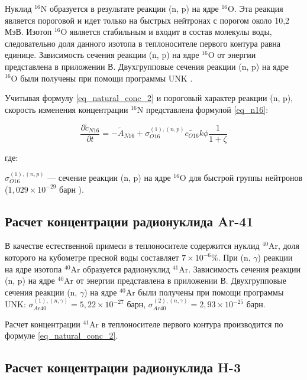 Нуклид $^{16}\text{N}$ образуется в результате реакции (n, p) на ядре $^{16}\text{O}$. Эта реакция является 
пороговой и идет только на быстрых нейтронах с порогом около 10,2 МэВ. Изотоп $^{16}\text{O}$ является стабильным и 
входит в состав молекулы воды, следовательно доля данного изотопа в теплоносителе первого контура равна единице. 
Зависимость сечения реакции (n, p) на ядре $^{16}\text{O}$ от энергии представлена в приложении В. Двухгрупповые 
сечения реакции (n, p) на ядре $^{16}\text{O}$ были получены при помощи программы UNK \cite{unk}.

Учитывая формулу \ref{eq_natural_conc_2} и пороговый характер реакции (n, p), скорость изменения концентрации 
$^{16}\text{N}$ представлена формулой \ref{eq_n16}:

\begin{equation}
    \label{eq_n16}
    \frac{\partial \widetilde{c}_{N16}}{\partial t} = -\widetilde{A}_{N16} + \sigma_{O16}^{(1), (n, p)} \widetilde{c_{O16}}
        k \phi \frac{1}{1 + \zeta}
\end{equation}

где:
\begin{description}
    \item $\sigma_{O16}^{(1), (n, p)}$ --- сечение реакции (n, p) на ядре $^{16}\text{O}$ для быстрой группы нейтронов 
        ($1,029 \times 10^{-29}$ барн \cite{unk}).
\end{description}

\subsection{Расчет концентрации радионуклида Ar-41}

В качестве естественной примеси в теплоносителе содержится нуклид $^{40}\text{Ar}$, доля которого на кубометре пресной 
воды составляет $7 \times 10^{-6} \%$. При (n, $\gamma$) реакции на ядре изотопа $^{40}\text{Ar}$ образуется радионуклид 
$^{41}\text{Ar}$. Зависимость сечения реакции (n, p) на ядре $^{40}\text{Ar}$ от энергии представлена в 
приложении В. Двухгрупповые сечения реакции (n, $\gamma$) на ядре $^{40}\text{Ar}$ были получены при помощи программы 
UNK: 
$\sigma_{Ar40}^{(1), (n, \gamma)} = 5,22 \times 10^{-27}$ барн, 
$\sigma_{Ar40}^{(2), (n, \gamma)} = 2,93 \times 10^{-25}$ барн.

Расчет концентрации $^{41}\text{Ar}$ в теплоносителе первого контура производится по формуле \ref{eq_natural_conc_2}.

\subsection{Расчет концентрации радионуклида H-3}

